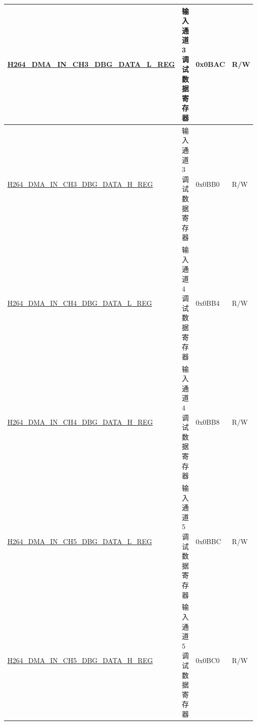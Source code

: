 \begin{longtable}{ | p{7.5cm} | p{5.7cm} | p{1.2cm} | p{1cm} | }
    \hyperref[regdesc:H264DMAINCH3DBGDATALREG]{H264\_DMA\_IN\_CH3\_DBG\_DATA\_L\_REG} & 输入通道 3 调试数据寄存器 & 0x0BAC & R/W \\ \hline
    \hyperref[regdesc:H264DMAINCH3DBGDATAHREG]{H264\_DMA\_IN\_CH3\_DBG\_DATA\_H\_REG} & 输入通道 3 调试数据寄存器 & 0x0BB0 & R/W \\ \hline
    \hyperref[regdesc:H264DMAINCH4DBGDATALREG]{H264\_DMA\_IN\_CH4\_DBG\_DATA\_L\_REG} & 输入通道 4 调试数据寄存器 & 0x0BB4 & R/W \\ \hline
    \hyperref[regdesc:H264DMAINCH4DBGDATAHREG]{H264\_DMA\_IN\_CH4\_DBG\_DATA\_H\_REG} & 输入通道 4 调试数据寄存器 & 0x0BB8 & R/W \\ \hline
    \hyperref[regdesc:H264DMAINCH5DBGDATALREG]{H264\_DMA\_IN\_CH5\_DBG\_DATA\_L\_REG} & 输入通道 5 调试数据寄存器 & 0x0BBC & R/W \\ \hline
    \hyperref[regdesc:H264DMAINCH5DBGDATAHREG]{H264\_DMA\_IN\_CH5\_DBG\_DATA\_H\_REG} & 输入通道 5 调试数据寄存器 & 0x0BC0 & R/W \\ \hline


\end{longtable}
